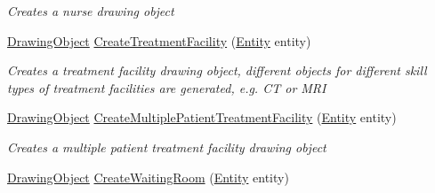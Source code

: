 \begin{DoxyCompactItemize}
\begin{DoxyCompactList}\small\item\em Creates a nurse drawing object \end{DoxyCompactList}\item 
\hyperlink{class_w_p_f_visualization_base_1_1_drawing_object}{Drawing\+Object} \hyperlink{class_sample_hospital_model_1_1_visualization_1_1_w_p_f_visualization_engine_health_care_department_control_unit_aa97bfcd681045655d1d5e43d77a1722a}{Create\+Treatment\+Facility} (\hyperlink{class_simulation_core_1_1_h_c_c_m_elements_1_1_entity}{Entity} entity)
\begin{DoxyCompactList}\small\item\em Creates a treatment facility drawing object, different objects for different skill types of treatment facilities are generated, e.\+g. CT or M\+RI \end{DoxyCompactList}\item 
\hyperlink{class_w_p_f_visualization_base_1_1_drawing_object}{Drawing\+Object} \hyperlink{class_sample_hospital_model_1_1_visualization_1_1_w_p_f_visualization_engine_health_care_department_control_unit_a88c622beb3aaa3efa3e10e9cf9a3ce24}{Create\+Multiple\+Patient\+Treatment\+Facility} (\hyperlink{class_simulation_core_1_1_h_c_c_m_elements_1_1_entity}{Entity} entity)
\begin{DoxyCompactList}\small\item\em Creates a multiple patient treatment facility drawing object \end{DoxyCompactList}\item 
\hyperlink{class_w_p_f_visualization_base_1_1_drawing_object}{Drawing\+Object} \hyperlink{class_sample_hospital_model_1_1_visualization_1_1_w_p_f_visualization_engine_health_care_department_control_unit_ae89366f9a28ea6a3ac75891fca0f50a9}{Create\+Waiting\+Room} (\hyperlink{class_simulation_core_1_1_h_c_c_m_elements_1_1_entity}{Entity} entity)\hypertarget{class_sample_hospital_model_1_1_visualization_1_1_w_p_f_visualization_engine_health_care_department_control_unit_ae89366f9a28ea6a3ac75891fca0f50a9}{}\label{class_sample_hospital_model_1_1_visualization_1_1_w_p_f_visualization_engine_health_care_department_control_unit_ae89366f9a28ea6a3ac75891fca0f50a9}


\end{DoxyCompactItemize}
